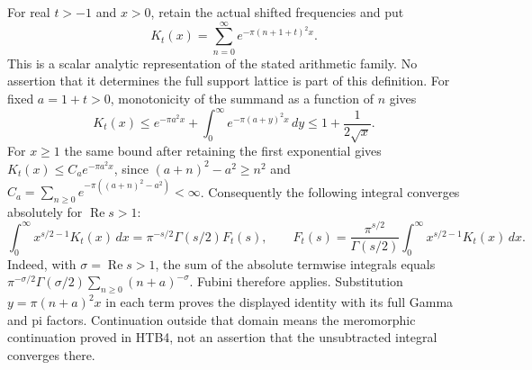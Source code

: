 For real $t>-1$ and $x>0$, retain the actual shifted frequencies and put
\begin{equation}\tag{ZTC2}
 K_t(x)=\sum_{n=0}^{\infty}
               e^{-\pi(n+1+t)^2x}.
\end{equation}
This is a scalar analytic representation of the stated arithmetic
family. No assertion that it determines the full support lattice is
part of this definition. For fixed $a=1+t>0$, monotonicity of the
summand as a function of $n$ gives
\begin{equation}\tag{ZTC3}
 K_t(x)\le e^{-\pi a^2x}
              +\int_0^\infty e^{-\pi(a+y)^2x}\,dy
 \le 1+\frac1{2\sqrt x}.
\end{equation}
For $x\ge1$ the same bound after retaining the first exponential
gives $K_t(x)\le C_a e^{-\pi a^2x}$, since
$(a+n)^2-a^2\ge n^2$ and
$C_a=\sum_{n\ge0}e^{-\pi((a+n)^2-a^2)}<\infty$.
Consequently the following integral converges absolutely for
$\operatorname{Re}s>1$:
\begin{equation}\tag{ZTC4}
 \int_0^\infty x^{s/2-1}K_t(x)\,dx
   =\pi^{-s/2}\Gamma(s/2)F_t(s),\qquad
 F_t(s)=\frac{\pi^{s/2}}{\Gamma(s/2)}
                \int_0^\infty x^{s/2-1}K_t(x)\,dx.
\end{equation}
Indeed, with $\sigma=\operatorname{Re}s>1$, the sum of the
absolute termwise integrals equals
$\pi^{-\sigma/2}\Gamma(\sigma/2)\sum_{n\ge0}(n+a)^{-\sigma}$.
Fubini therefore applies. Substitution $y=\pi(n+a)^2x$ in each
term proves the displayed identity with its full Gamma and pi factors.
Continuation outside that domain means the meromorphic continuation
proved in HTB4, not an assertion that the unsubtracted integral converges
there.

